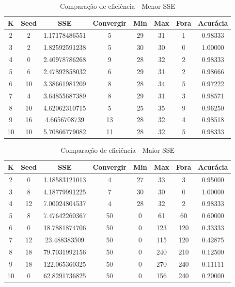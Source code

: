 \documentclass[12pt, a4paper]{article}
\begin{document}
\begin{table}[!ht]
	\centering
	\caption{Comparação de eficiência - Menor SSE}	
	\label{tabMelhor}
	\begin{tabular}{|c|c|c|c|c|c|c|c|}
	\hline
	K & Seed & SSE & Convergir & Min & Max & Fora & Acurácia\\
	\hline
	2 & 2 & 1.17178486551 & 5 & 29 & 31 & 1 & 0.98333 \\
	\hline
	3 & 2 & 1.82592591238 & 5 & 30 & 30 & 0 & 1.00000 \\
	\hline
	4 & 0 & 2.40978786268 & 9 & 28 & 32 & 2 & 0.98333\\
	\hline
	5 & 6 & 2.47892858032 & 6 & 29 & 31 & 2 & 0.98666\\
	\hline
	6 & 10 & 3.38661981209 & 8 & 28 & 34 & 5 & 0.97222\\
	\hline
	7 & 4 & 3.64855687389 & 8 & 29 & 31 & 3 & 0.98571\\
	\hline
	8 & 10 & 4.62062310715 & 5 & 25 & 35 & 9 & 0.96250\\ %
	\hline
	9 & 16 & 4.6656708739 & 13 & 28 & 32 & 4 & 0.98518\\
	\hline
	10 & 10 & 5.70866779082 & 11 & 28 & 32 & 5 & 0.98333\\
	\hline
	\end{tabular}
\end{table}

\begin{table}[!ht]
	\centering
	\caption{Comparação de eficiência - Maior SSE}	
	\label{tabPior}
	\begin{tabular}{|c|c|c|c|c|c|c|c|}
	\hline
	K & Seed & SSE & Convergir & Min & Max & Fora & Acurácia\\
	\hline
	2 & 0 & 1.18583121013 & 4 & 27 & 33 & 3 & 0.95000 \\
	\hline
	3 & 8 & 4.18779991225 & 7 & 30 & 30 & 0 & 1.00000 \\
	\hline
	4 & 12 & 7.00024804537 & 4 & 28 & 32 & 2 & 0.98333\\
	\hline
	5 & 8 & 7.47642260367 & 50 & 0 & 61 & 60 & 0.60000\\
	\hline
	6 & 0 & 18.7881874706 & 50 & 0 & 123 & 120 & 0.33333\\
	\hline
	7 & 12 & 23.488383509 & 50 & 0 & 115 & 120 & 0.42875\\
	\hline
	8 & 18 & 79.7031992156 & 50 & 0 & 240 & 210 & 0.12500 \\
	\hline
	9 & 18 & 122.065360325 & 50 & 0 & 270 & 240 & 0.11111\\
	\hline
	10 & 0 & 62.8291736825 & 50 & 0 & 156 & 240 & 0.20000\\
	\hline
	\end{tabular}
\end{table}
\end{document}
